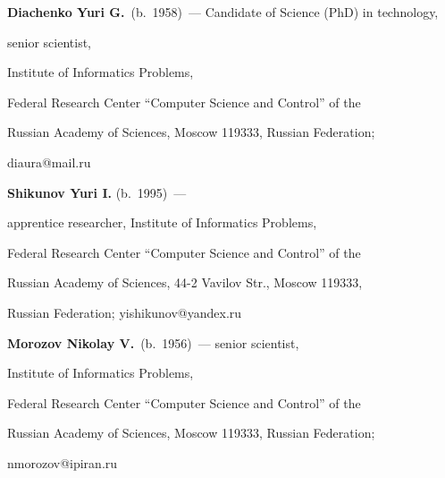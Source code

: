 \vspace*{3pt}



\noindent

\textbf{Diachenko Yuri G.}\ (b.\ 1958)~--- Candidate of Science (PhD) in technology, 

senior scientist,

Institute of Informatics Problems, 

Federal Research Center ``Computer Science and Control'' of the

 Russian Academy of Sciences, Moscow 119333, Russian Federation;

diaura@mail.ru



\vspace*{3pt}

\noindent

\textbf{Shikunov Yuri I.} (b.\ 1995)~--- 

apprentice researcher, Institute of Informatics Problems, 

Federal Research Center ``Computer Science and Control'' of the

 Russian Academy of Sciences, 44-2 Vavilov Str., Moscow 119333, 

 Russian Federation; yishikunov@yandex.ru



\vspace*{3pt}





\noindent

\textbf{Morozov Nikolay V.}\ (b.\ 1956)~--- senior scientist, 

Institute of Informatics Problems, 

Federal Research Center ``Computer Science and Control'' of the

 Russian Academy of Sciences, Moscow 119333, Russian Federation;\linebreak

 nmorozov@ipiran.ru





 \label{end\stat}





\renewcommand{\bibname}{\protect\rm Литература}

